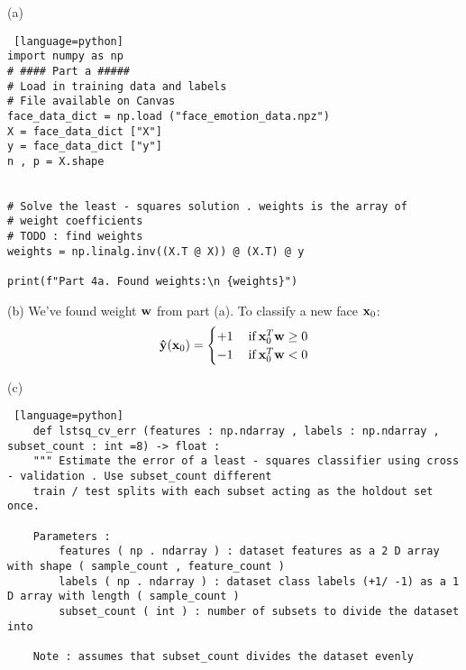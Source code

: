 \documentclass[a4paper, 12pt]{article}
\begin{document}
\begin{solution}
\end{solution}

\begin{problem} [Problem 4]
\end{problem}
\begin{solution}
(a)
\begin{lstlisting} [language=python]
import numpy as np
# #### Part a #####
# Load in training data and labels
# File available on Canvas
face_data_dict = np.load ("face_emotion_data.npz")
X = face_data_dict ["X"]
y = face_data_dict ["y"]
n , p = X.shape


# Solve the least - squares solution . weights is the array of
# weight coefficients
# TODO : find weights
weights = np.linalg.inv((X.T @ X)) @ (X.T) @ y

print(f"Part 4a. Found weights:\n {weights}")
\end{lstlisting}
(b)
We've found weight $\mathbf{w}$ from part (a). To classify a new face $\mathbf{x}_0$:
\[
\mathbf{\hat{y}}(\mathbf{x}_0) = \begin{cases}
    +1 & \:\text{if}\: \mathbf{x}_0^T \mathbf{w} \geq 0 \\
    -1 & \:\text{if}\: \mathbf{x}_0^T \mathbf{w} < 0
\end{cases}
\]

(c)
\begin{lstlisting} [language=python]
    def lstsq_cv_err (features : np.ndarray , labels : np.ndarray , subset_count : int =8) -> float :
    """ Estimate the error of a least - squares classifier using cross - validation . Use subset_count different
    train / test splits with each subset acting as the holdout set once.
    
    Parameters :
        features ( np . ndarray ) : dataset features as a 2 D array with shape ( sample_count , feature_count )
        labels ( np . ndarray ) : dataset class labels (+1/ -1) as a 1 D array with length ( sample_count )
        subset_count ( int ) : number of subsets to divide the dataset into
    
    Note : assumes that subset_count divides the dataset evenly
   

\end{lstlisting}
\end{solution}
\end{document}

